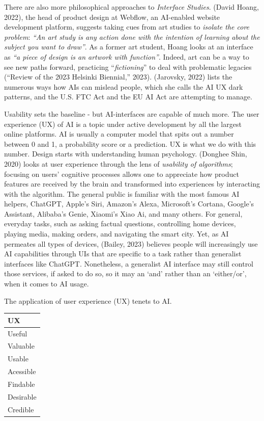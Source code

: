 \documentclass[
  letterpaper,
  DIV=11,
  numbers=noendperiod]{scrartcl}
\begin{document}
There are also more philosophical approaches to \emph{Interface
Studies}. (David Hoang, 2022), the head of product design at Webflow, an
AI-enabled website development platform, suggests taking cues from art
studies to \emph{isolate the core problem}: \emph{``An art study is any
action done with the intention of learning about the subject you want to
draw''}. As a former art student, Hoang looks at an interface as
\emph{``a piece of design is an artwork with function''}. Indeed, art
can be a way to see new paths forward, practicing ``\emph{fictioning}''
to deal with problematic legacies ({``Review of the 2023 {Helsinki
Biennial},''} 2023). (Jarovsky, 2022) lists the numerous ways how AIs
can mislead people, which she calls the AI UX dark patterns, and the
U.S. FTC Act and the EU AI Act are attempting to manage.

Usability sets the baseline - but AI-interfaces are capable of much
more. The user experience (UX) of AI is a topic under active development
by all the largest online platforms. AI is usually a computer model that
spits out a number between 0 and 1, a probability score or a prediction.
UX is what we do with this number. Design starts with understanding
human psychology. (Donghee Shin, 2020) looks at user experience through
the lens of \emph{usability of algorithms}; focusing on users' cognitive
processes allows one to appreciate how product features are received by
the brain and transformed into experiences by interacting with the
algorithm. The general public is familiar with the most famous AI
helpers, ChatGPT, Apple's Siri, Amazon's Alexa, Microsoft's Cortana,
Google's Assistant, Alibaba's Genie, Xiaomi's Xiao Ai, and many others.
For general, everyday tasks, such as asking factual questions,
controlling home devices, playing media, making orders, and navigating
the smart city. Yet, as AI permeates all types of devices, (Bailey,
2023) believes people will increasingly use AI capabilities through UIs
that are specific to a task rather than generalist interfaces like
ChatGPT. Nonetheless, a generalist AI interface may still control those
services, if asked to do so, so it may an `and' rather than an
`either/or', when it comes to AI usage.

The application of user experience (UX) tenets to AI.

\begin{longtable}[]{@{}l@{}}
\toprule\noalign{}
UX \\
\midrule\noalign{}
\endhead
\bottomrule\noalign{}
\endlastfoot
Useful \\
Valuable \\
Usable \\
Acessible \\
Findable \\
Desirable \\
Credible \\
\end{longtable}
\end{document}
